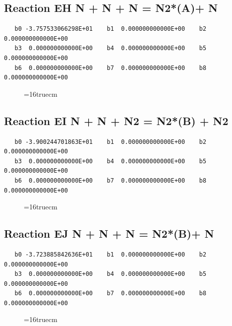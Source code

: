 \documentclass[12pt,dvipdfm]{article}
\begin{document}
\subsection{
Reaction EH N + N + N = N2*(A)+ N}
\begin{small}\begin{verbatim}
   b0 -3.757533066298E+01    b1  0.000000000000E+00    b2  0.000000000000E+00
   b3  0.000000000000E+00    b4  0.000000000000E+00    b5  0.000000000000E+00
   b6  0.000000000000E+00    b7  0.000000000000E+00    b8  0.000000000000E+00
   \end{verbatim}\end{small}
\begin{figure}[h!]
\label{n2rates}
\epsfxsize=16truecm
\end{figure}
\newpage

\subsection{
Reaction EI N + N + N2 = N2*(B) + N2}
\begin{small}\begin{verbatim}
   b0 -3.900244701863E+01    b1  0.000000000000E+00    b2  0.000000000000E+00
   b3  0.000000000000E+00    b4  0.000000000000E+00    b5  0.000000000000E+00
   b6  0.000000000000E+00    b7  0.000000000000E+00    b8  0.000000000000E+00
   \end{verbatim}\end{small}
\begin{figure}[h!]
\label{n2rates}
\epsfxsize=16truecm
\end{figure}
\newpage

\subsection{
Reaction EJ N + N + N = N2*(B)+ N}
\begin{small}\begin{verbatim}
   b0 -3.723885842636E+01    b1  0.000000000000E+00    b2  0.000000000000E+00
   b3  0.000000000000E+00    b4  0.000000000000E+00    b5  0.000000000000E+00
   b6  0.000000000000E+00    b7  0.000000000000E+00    b8  0.000000000000E+00
   \end{verbatim}\end{small}
\begin{figure}[h!]
\label{n2rates}
\epsfxsize=16truecm
\end{figure}
\newpage
\end{document}

